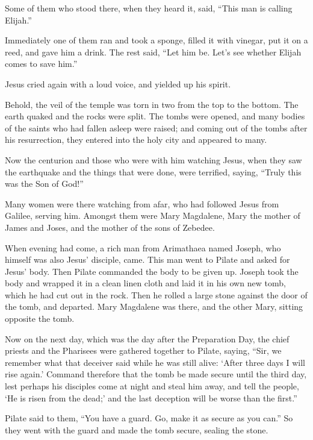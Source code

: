  Some of them who stood there, when they heard it, said,
``This man is calling Elijah.''

 Immediately one of them ran and took a sponge, filled it
with vinegar, put it on a reed, and gave him a drink.  The
rest said, ``Let him be. Let's see whether Elijah comes to save him.''

 Jesus cried again with a loud voice, and yielded up his
spirit.

 Behold, the veil of the temple was torn in two from the
top to the bottom. The earth quaked and the rocks were split.
 The tombs were opened, and many bodies of the saints who
had fallen asleep were raised;  and coming out of the tombs
after his resurrection, they entered into the holy city and appeared to
many.

 Now the centurion and those who were with him watching
Jesus, when they saw the earthquake and the things that were done, were
terrified, saying, ``Truly this was the Son of God!''

 Many women were there watching from afar, who had followed
Jesus from Galilee, serving him.  Amongst them were Mary
Magdalene, Mary the mother of James and Joses, and the mother of the
sons of Zebedee.

 When evening had come, a rich man from Arimathaea named
Joseph, who himself was also Jesus' disciple, came.  This
man went to Pilate and asked for Jesus' body. Then Pilate commanded the
body to be given up.  Joseph took the body and wrapped it
in a clean linen cloth  and laid it in his own new tomb,
which he had cut out in the rock. Then he rolled a large stone against
the door of the tomb, and departed.  Mary Magdalene was
there, and the other Mary, sitting opposite the tomb.

 Now on the next day, which was the day after the
Preparation Day, the chief priests and the Pharisees were gathered
together to Pilate,  saying, ``Sir, we remember what that
deceiver said while he was still alive: `After three days I will rise
again.'  Command therefore that the tomb be made secure
until the third day, lest perhaps his disciples come at night and steal
him away, and tell the people, `He is risen from the dead;' and the last
deception will be worse than the first.''

 Pilate said to them, ``You have a guard. Go, make it as
secure as you can.''  So they went with the guard and made
the tomb secure, sealing the stone.

